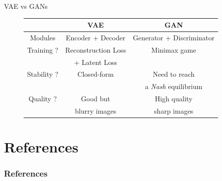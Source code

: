 \documentclass{beamer}
\begin{document}
\begin{frame}{VAE vs GANs}
    \begin{figure}
        \centering
        \begin{tabular}{|c|c|c|}
                \hline
                \cellcolor{cBlue!20} & \cellcolor{cBlue!20} VAE & \cellcolor{cBlue!20} GAN \\
                \hline
                \hline
                Modules & Encoder + Decoder & Generator + Discriminator \\
                \hline
                Training ? & Reconstruction Loss & Minimax game \\
                & + Latent Loss & \\
                \hline
                Stability ? & \cellcolor{cGreen!50} Closed-form & \cellcolor{cRed!50} Need to reach \\
                & \cellcolor{cGreen!50} & \cellcolor{cRed!50} a \emph{Nash} equilibrium  \\
                \hline
                Quality ? & \cellcolor{cOrange!50} Good but  & \cellcolor{cGreen!50} High quality \\
                & \cellcolor{cOrange!50} blurry images & \cellcolor{cGreen!50} sharp images \\
                \hline
                \hline
        \end{tabular}
    \end{figure}
\end{frame}



\section*{References}

\begin{frame}[allowframebreaks]\small
  \frametitle{References}
  \renewcommand*{\bibfont}{\footnotesize}
  \printbibliography
\end{frame}
\end{document}
